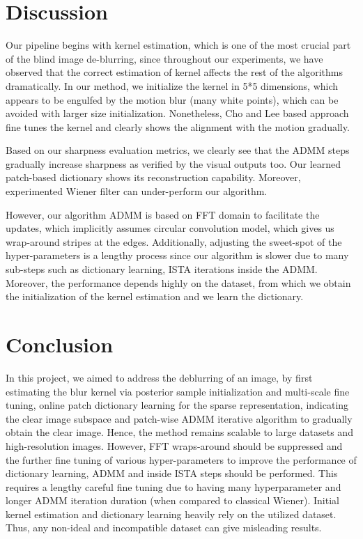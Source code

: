 \documentclass{article}
\theoremstyle{definition}
\begin{document}
\section{Discussion}


Our pipeline begins with kernel estimation, which is one of the most crucial part of the blind image de-blurring, since throughout our experiments, we have observed that the correct estimation of kernel affects the rest of the algorithms dramatically. In our method, we initialize the kernel in 5*5 dimensions, which appears to be engulfed by the motion blur (many white points), which can be avoided with larger size initialization. Nonetheless, Cho and Lee based approach fine tunes the kernel and clearly shows the alignment with the motion gradually. 


Based on our sharpness evaluation metrics, we clearly see that the  ADMM steps gradually increase sharpness as verified by the visual outputs too. Our learned patch-based dictionary shows its reconstruction capability. Moreover, experimented Wiener filter can under-perform our algorithm.

However, our algorithm ADMM is based on FFT domain to facilitate the updates, which implicitly assumes circular convolution model, which gives us wrap-around stripes at the edges. Additionally, adjusting the sweet-spot of the hyper-parameters is a lengthy process since our algorithm is slower due to many sub-steps such as dictionary learning, ISTA iterations inside the ADMM. Moreover, the performance depends highly on the dataset, from which we obtain the initialization of the kernel estimation and we learn the dictionary.













\section{Conclusion}

In this project, we aimed to address the deblurring of an image, by first estimating  the blur kernel via posterior sample initialization and multi-scale fine tuning, online patch dictionary learning for the sparse representation, indicating the clear image subspace and patch-wise ADMM iterative algorithm to gradually obtain the clear image. Hence, the method remains scalable to large datasets and high-resolution images. However, FFT wraps-around should be suppressed and the further fine tuning of various hyper-parameters to improve the performance of dictionary learning, ADMM and inside ISTA steps should be performed. This requires a lengthy careful fine tuning due to having many hyperparameter and longer ADMM iteration duration (when compared to classical Wiener). Initial kernel estimation and dictionary learning heavily rely on the utilized dataset. Thus, any non-ideal and incompatible dataset can give misleading results.
\end{document}
